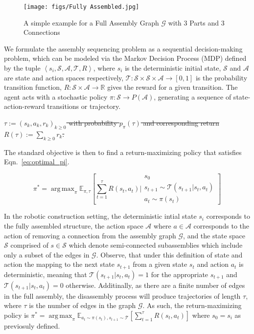 \documentclass{article}
\DeclareMathOperator*{\argmax}{arg\,max}
\begin{document}
\begin{figure}[!htb]
    \centering
    \texttt{[image: figs/Fully Assembled.jpg]}
      \caption{A simple example for a Full Assembly Graph $\mathcal{G}$ with 3 Parts and 3 Connections}
      \label{fig: G}
\end{figure}


We formulate the assembly sequencing problem as a sequential decision-making problem, which can be modeled via the Markov Decision Process (MDP) defined by the tuple $\left\langle s_i, \mathcal{S}, \mathcal{A}, \mathcal{T}, R\right\rangle$, where $s_i$ is the deterministic initial state, $\mathcal{S}$ and $\mathcal{A}$ are state and action spaces respectively, $\mathcal{T}: \mathcal{S} \times \mathcal{S} \times \mathcal{A} \rightarrow [0,1]$ is the probability transition function, $R: \mathcal{S} \times \mathcal{A} \rightarrow \mathbb{R}$ gives the reward for a given transition. The agent acts with a stochastic policy $\pi: \mathcal{S} \rightarrow P(\mathcal{A})$, generating a sequence of state-action-reward transitions or trajectory.

\sout{$\tau:=\left(s_k, a_k, r_k\right)_{k \geq 0}$ with probability $p_\pi(\tau)$ and corresponding return $R(\tau):=\sum_{k \geq 0}  r_k$.} 

The standard objective is then to find a return-maximizing policy that satisfies Eqn.~\ref{eq:optimal_pi}.

\begin{equation} \label{eq:optimal_pi}
    \pi^* = \argmax_{\pi} \mathbb{E}_{\pi, \tau}\left [\sum_{t=1}^{\tau} R(s_t,a_t) \bigg| 
    \begin{array}{c}
        s_0\\
        s_{t+1}\sim \mathcal{T}(s_{t+1} | s_t, a_t)\\
        a_t\sim \pi(s_t)
    \end{array}
    \right ]
\end{equation}


In the robotic construction setting, the deterministic intial state $s_i$ corresponds to the fully assembled structure, the action space $\mathcal{A}$ where $a \in \mathcal{A}$ corresponds to the action of removing a connection from the assembly graph $\mathcal{G}$, and the state space $\mathcal{S}$ comprised of $s \in \mathcal{S}$ which denote semi-connected subassemblies which include only a subset of the edges in $\mathcal{G}$. Observe, that under this definition of state and action the mapping to the next state $s_{t+1}$ from a given state $s_t$ and action $a_t$ is deterministic, meaning that $\mathcal{T}(s_{t+1} | s_t, a_t) = 1$ for the appropriate $s_{t+1}$ and $\mathcal{T}(s_{t+1} | s_t, a_t) = 0$ otherwise. Additinally, as there are a finite number of edges in the full assembly, the disassembly process will produce trajectories of length $\tau$, where $\tau$ is the number of edges in the graph $\mathcal{G}$. As such, the return-maximizing policy is $\pi^*=\argmax_\pi \mathbb{E}_{a_t\sim\pi(s_t), s_{t+1}\sim\mathcal{T}}[\sum_{t=1}^{\tau}R(s_t, a_t)]$ where $s_0 = s_i$ as previosuly defined. 
\end{document}
